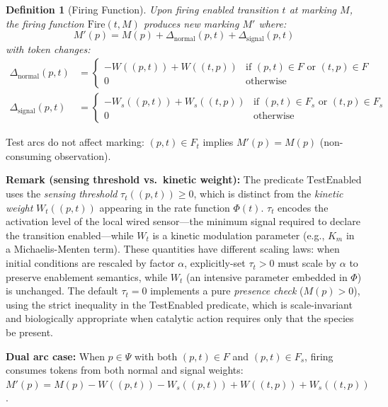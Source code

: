 \documentclass[10pt,letterpaper]{article}
\newtheorem{definition}{Definition}
\begin{document}
\begin{definition}[Firing Function]
Upon firing enabled transition $t$ at marking $M$, the firing function $\text{Fire}(t,M)$ produces new marking $M'$ where:
\begin{equation}
M'(p) = M(p) + \Delta_{\text{normal}}(p,t) + \Delta_{\text{signal}}(p,t)
\end{equation}
with token changes:
\begin{align}
\Delta_{\text{normal}}(p,t) &= \begin{cases}
-W((p,t)) + W((t,p)) & \text{if } (p,t) \in F \text{ or } (t,p) \in F \\
0 & \text{otherwise}
\end{cases} \\
\Delta_{\text{signal}}(p,t) &= \begin{cases}
-W_s((p,t)) + W_s((t,p)) & \text{if } (p,t) \in F_s \text{ or } (t,p) \in F_s \\
0 & \text{otherwise}
\end{cases}
\end{align}
\end{definition}

Test arcs do not affect marking: $(p,t) \in F_t$ implies $M'(p) = M(p)$ (non-consuming observation).

\textbf{Remark (sensing threshold vs.\ kinetic weight):} The predicate $\text{TestEnabled}$ uses the \emph{sensing threshold} $\tau_t((p,t)) \geq 0$, which is distinct from the \emph{kinetic weight} $W_t((p,t))$ appearing in the rate function $\Phi(t)$. $\tau_t$ encodes the activation level of the local wired sensor---the minimum signal required to declare the transition enabled---while $W_t$ is a kinetic modulation parameter (e.g., $K_m$ in a Michaelis-Menten term). These quantities have different scaling laws: when initial conditions are rescaled by factor $\alpha$, explicitly-set $\tau_t > 0$ must scale by $\alpha$ to preserve enablement semantics, while $W_t$ (an intensive parameter embedded in $\Phi$) is unchanged. The default $\tau_t = 0$ implements a pure \emph{presence check} ($M(p) > 0$), using the strict inequality in the TestEnabled predicate, which is scale-invariant and biologically appropriate when catalytic action requires only that the species be present.

\textbf{Dual arc case:} When $p \in \Psi$ with both $(p,t) \in F$ and $(p,t) \in F_s$, firing consumes tokens from both normal and signal weights: $M'(p) = M(p) - W((p,t)) - W_s((p,t)) + W((t,p)) + W_s((t,p))$.
\end{document}
